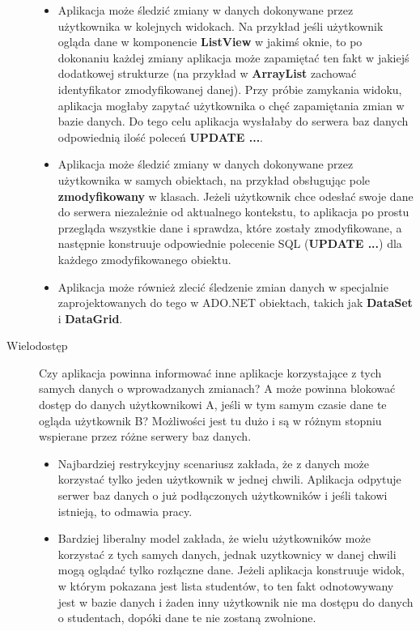 \begin{description}
	\begin{itemize}
	\item Aplikacja może śledzić zmiany w danych dokonywane przez użytkownika w kolejnych widokach.
	      Na przykład jeśli użytkownik ogląda dane w komponencie {\bf ListView} w jakimś oknie, to 
	      po dokonaniu każdej zmiany aplikacja może zapamiętać ten fakt w jakiejś dodatkowej strukturze
	      (na przykład w {\bf ArrayList} zachować identyfikator zmodyfikowanej danej). Przy próbie
	      zamykania widoku, aplikacja mogłaby zapytać użytkownika o chęć zapamiętania zmian w bazie danych.
	      Do tego celu aplikacja wysłałaby do serwera baz danych odpowiednią ilość poleceń {\bf UPDATE ...}.

	\item Aplikacja może śledzić zmiany w danych dokonywane przez użytkownika w samych obiektach, na
	      przykład obsługując pole {\bf zmodyfikowany} w klasach. Jeżeli użytkownik chce odesłać swoje
	      dane do serwera niezależnie od aktualnego kontekstu, 
	      to aplikacja po prostu przegląda wszystkie dane i sprawdza, które zostały
	      zmodyfikowane, a następnie konstruuje odpowiednie polecenie SQL ({\bf UPDATE ...}) dla każdego
	      zmodyfikowanego obiektu.
	      	      
	\item Aplikacja może również zlecić śledzenie zmian danych w specjalnie zaprojektowanych do tego w ADO.NET
	      obiektach, takich jak {\bf DataSet} i {\bf DataGrid}.
	\end{itemize}
\item [Wielodostęp] Czy aplikacja powinna informować inne aplikacje korzystające z tych samych danych o
wprowadzanych zmianach? A może powinna blokować dostęp do danych użytkownikowi A, jeśli w tym samym czasie
dane te ogląda użytkownik B? Możliwości jest tu dużo i są w różnym stopniu wspierane przez różne
serwery baz danych.

	\begin{itemize}
	\item Najbardziej restrykcyjny scenariusz zakłada, że z danych może korzystać tylko jeden użytkownik
	w jednej chwili. Aplikacja odpytuje serwer baz danych o już podłączonych użytkowników i jeśli
	takowi istnieją, to odmawia pracy.

	\item Bardziej liberalny model zakłada, że wielu użytkowników może korzystać z tych samych danych,
	jednak uzytkownicy w danej chwili mogą oglądać tylko rozłączne dane. Jeżeli aplikacja
	konstruuje widok, w którym pokazana jest lista studentów, to ten fakt odnotowywany jest w bazie danych
	i żaden inny użytkownik nie ma dostępu do danych o studentach, dopóki dane te nie zostaną zwolnione.


\end{itemize}
\end{description}
